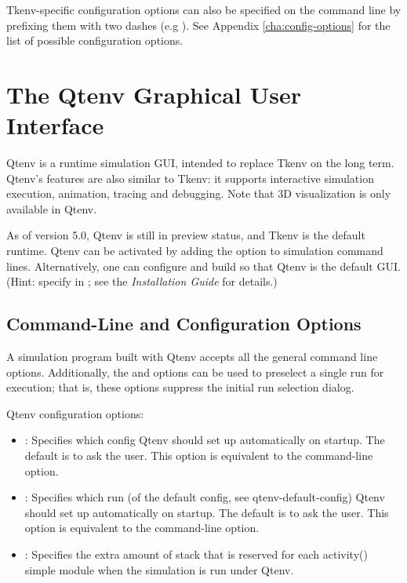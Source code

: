 Tkenv-specific configuration options can also be specified on the command line
by prefixing them with two dashes (e.g ). See
Appendix \ref{cha:config-options} for the list of possible configuration options.


\section{The Qtenv Graphical User Interface}
\label{sec:run-sim:qtenv}

Qtenv is a runtime simulation GUI, intended to replace Tkenv
on the long term. Qtenv's features are also similar to Tkenv: it supports
interactive simulation execution, animation, tracing and debugging. Note
that 3D visualization is only available in Qtenv.

As of version {\opp} 5.0, Qtenv is still in preview status, and Tkenv is the
default runtime. Qtenv can be activated by adding the  option
to simulation command lines. Alternatively, one can configure and build
{\opp} so that Qtenv is the default GUI. (Hint: specify 
in ; see the \textit{Installation Guide} for details.)


\subsection{Command-Line and Configuration Options}
\label{sec:run-sim:qtenv-options}

A simulation program built with Qtenv accepts all the general command line
options.  Additionally, the 
and  options can be used to preselect a single run for execution;
that is, these options suppress the initial run selection dialog.

Qtenv configuration options:

\begin{itemize}
  \item {}:
    Specifies which config Qtenv should set up automatically on startup. The
    default is to ask the user. This option is equivalent to the 
    command-line option.

  \item {}: Specifies which run (of the default
    config, see qtenv-default-config) Qtenv should set up automatically on startup.
    The default is to ask the user. This option is equivalent to the 
    command-line option.

  \item {}:
    Specifies the extra amount of stack that is reserved for each activity()
    simple module when the simulation is run under Qtenv.
\end{itemize}

